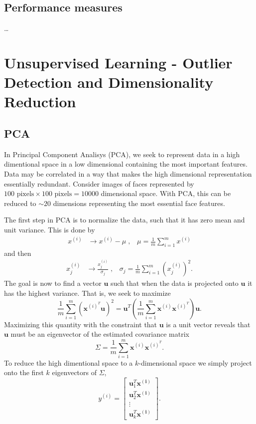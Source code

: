 \documentclass[oneside]{memoir}
\renewcommand{\vec}[1]{\ensuremath{\bm{#1}}}
\begin{document}
\subsection{Performance measures}
\dots

\section{Unsupervised Learning - Outlier Detection and Dimensionality Reduction}

\subsection{PCA}
In Principal Component Analisys (PCA), we seek to represent data in a high dimentional space in a low dimensional containing the most important features. Data may be correlated in a way that makes the high dimensional representation essentially redundant. Consider images of faces represented by $100 \text{ pixels}\times 100 \text{ pixels} = 10000$ dimensional space. With PCA, this can be reduced to $\sim20$ dimensions representing the most essential face features. 

The first step in PCA is to normalize the data, such that it has zero mean and unit variance. This is done by
\begin{align}
  x^{(i)} &\rightarrow x^{(i)} - \mu\;,\;\;\; \mu = \frac{1}{m}\sum_{i=1}^m x^{(i)} 
\end{align}
and then
\begin{align}
  x^{(i)}_j &\rightarrow \frac{x^{(i)}_j}{\sigma_j}\;,\;\;\; \sigma_j = \frac{1}{m}\sum_{i=1}^m  \left(x^{(i)}_j\right)^2 .
\end{align}
The goal is now to find a vector $\vec{u}$ such that when the data is projected onto $\vec{u}$ it has the highest variance. That is, we seek to maximize
\begin{equation}
  \label{variance u projection}
  \frac{1}{m} \sum_{i=1}^m \left( \vec{x}^{(i)^T}\vec{u} \right)^2 = \vec{u}^T \left(\frac{1}{m}\sum_{i=1}^m \vec{x}^{(i)}\vec{x}^{(i)^T} \right) \vec{u}.
\end{equation}
Maximizing this quantity with the constraint that $\vec{u}$ is a unit vector reveals that $\vec{u}$ must be an eigenvector of the estimated covariance matrix
\begin{equation}
  \label{estimated covariance matrix}
\Sigma = \frac{1}{m}\sum_{i=1}^m \vec{x}^{(i)}\vec{x}^{(i)^T}.
\end{equation}
To reduce the high dimentional space to a $k$-dimensional space we simply project onto the first $k$ eigenvectors of $\Sigma$,
\begin{equation}
  \label{PCA y}
y^{(i)} = 
\left[  \begin{matrix}
    \vec{u}_1^T \vec{x^{(i)}} \\
    \vec{u}_2^T \vec{x^{(i)}} \\
    \vdots \\
    \vec{u}_k^T \vec{x^{(i)}} 
  \end{matrix}\right].
\end{equation}
\end{document}
